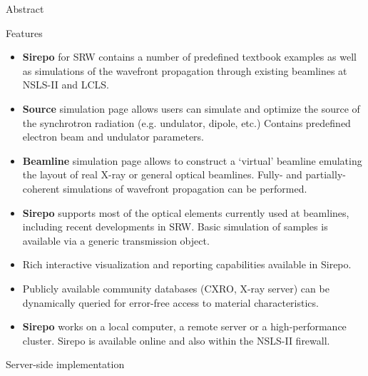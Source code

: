 \documentclass[final]{beamer}
\newlength{\onecolwid}
\begin{document}
\begin{frame}[t]
\begin{columns}[t]
\begin{column}{\onecolwid}
\begin{block}{\faInfoCircle{} Abstract}
\begin{alertblock}{\faMagic{} Features}
\begin{itemize}

\item \textbf{Sirepo} for SRW contains a number of predefined textbook examples
as well as simulations of the wavefront propagation through existing beamlines
at NSLS-II and LCLS.

\item \textbf{Source} simulation page allows users can simulate and
optimize the source of the synchrotron radiation (e.g. undulator, dipole, etc.)
Contains predefined electron beam and undulator parameters.

\item \textbf{Beamline} simulation page allows to construct a `virtual'
beamline emulating the layout of real X-ray or general optical beamlines. Fully-
and partially-coherent simulations of wavefront propagation can be performed.

\item \textbf{Sirepo} supports most of the optical elements currently used at
beamlines, including recent developments in SRW. Basic simulation of samples is
available via a generic transmission object.

\item Rich interactive visualization and reporting capabilities available in
Sirepo.

\item Publicly available community databases (CXRO, X-ray server) can be
dynamically queried for error-free access to material characteristics.

\item \textbf{Sirepo} works on a local computer, a remote server or a
high-performance cluster. Sirepo is available online and also within the NSLS-II
firewall.

\end{itemize}
\end{alertblock}

\end{block}


\vspace{-0.5cm}
\begin{block}{\faServer{} Server-side implementation}
\vspace{-0.5cm}


\end{block}
\end{column}
\end{columns}
\end{frame}
\end{document}
